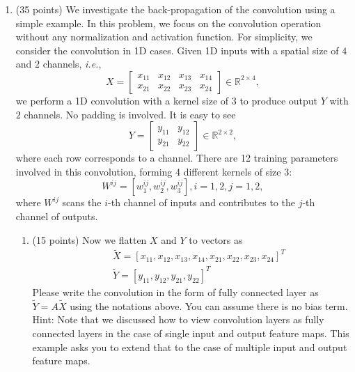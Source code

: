 \documentclass[11pt]{article}
\begin{document}
\begin{enumerate}
    \item (35 points) We investigate the back-propagation of the convolution using a simple example. In this problem, we focus on the convolution operation without any normalization and
    activation function. For simplicity, we consider the
    convolution in 1D cases. Given 1D inputs with a spatial size of $4$ and $2$ channels, \emph{i.e.},
    \begin{equation}
    X=
    \begin{bmatrix}
    x_{11} & x_{12} & x_{13} & x_{14} \\
    x_{21} & x_{22} & x_{23} & x_{24}
    \end{bmatrix}
    \in \mathbb{R}^{2 \times 4},
    \end{equation}
    we perform a 1D convolution with a kernel size of $3$ to produce output $Y$ with $2$ channels. No padding is involved. It is easy to see
    \begin{equation}
    Y=
    \begin{bmatrix}
    y_{11} & y_{12} \\
    y_{21} & y_{22}
    \end{bmatrix}
    \in \mathbb{R}^{2 \times 2},
    \end{equation}
    where each row corresponds to a channel. There are 12
    training parameters involved in this convolution, forming 4
    different kernels of size $3$:
    \begin{equation}
    W^{ij} = [w^{ij}_1, w^{ij}_2, w^{ij}_3], i=1,2, j=1,2,
    \end{equation}
    where $W^{ij}$ scans the $i$-th channel of inputs and
    contributes to the $j$-th channel of outputs.


    \begin{enumerate}
    \item (15 points) Now we flatten $X$ and $Y$ to vectors as
    \begin{eqnarray}
    &&\tilde X = [x_{11}, x_{12}, x_{13}, x_{14} , x_{21}, x_{22}, x_{23}, x_{24}]^T \nonumber \\
    &&\tilde Y = [y_{11}, y_{12}, y_{21}, y_{22}]^T \nonumber
    \end{eqnarray}
    Please write the convolution in the form of fully connected layer as $\tilde Y=A\tilde X$ using the notations above. You can assume there is no bias term.\\Hint: Note that we discussed how to view convolution layers as fully connected
    layers in the case of single input and output feature maps. This example asks you to extend that to the case of multiple input and output feature maps.\\


\end{enumerate}
\end{enumerate}
\end{document}
